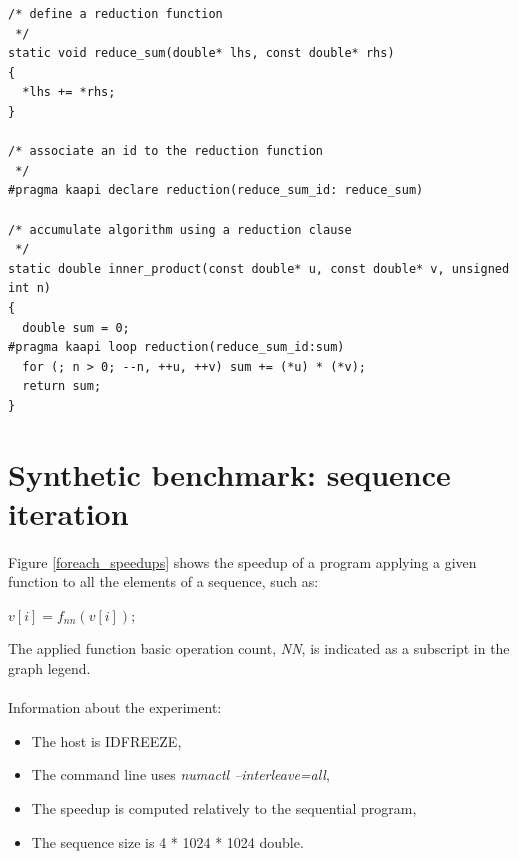 \documentclass[a4paper, 11pt]{article}
\begin{document}
\pagebreak
\begin{small}
\lstset{language=C}
\begin{lstlisting}[frame=tb, caption={inner\_product}]
/* define a reduction function
 */
static void reduce_sum(double* lhs, const double* rhs)
{
  *lhs += *rhs;
}

/* associate an id to the reduction function
 */
#pragma kaapi declare reduction(reduce_sum_id: reduce_sum)

/* accumulate algorithm using a reduction clause
 */
static double inner_product(const double* u, const double* v, unsigned int n)
{
  double sum = 0;
#pragma kaapi loop reduction(reduce_sum_id:sum)
  for (; n > 0; --n, ++u, ++v) sum += (*u) * (*v);
  return sum;
}
\end{lstlisting}
\end{small}

\newpage
\section{Synthetic benchmark: sequence iteration}

\paragraph{}
Figure \ref{foreach_speedups} shows the speedup of a program applying a given function to
all the elements of a sequence, such as:
\begin{center}
  $v[i] = f_{nn}(v[i]);$
\end{center}
The applied function basic operation count, \textit{NN}, is indicated as a subscript in the graph legend.

\paragraph{}
Information about the experiment:
\begin{itemize}
\item The host is IDFREEZE,
\item The command line uses \textit{numactl --interleave=all},
\item The speedup is computed relatively to the sequential program,
\item The sequence size is 4 * 1024 * 1024 double.
\end{itemize}
\end{document}
